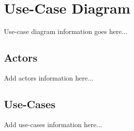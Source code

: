 \newpage
\section{Use-Case Diagram}
Use-case diagram information goes here...


\subsection{Actors}
Add actors information here...

\subsection{Use-Cases}
Add use-cases information here...